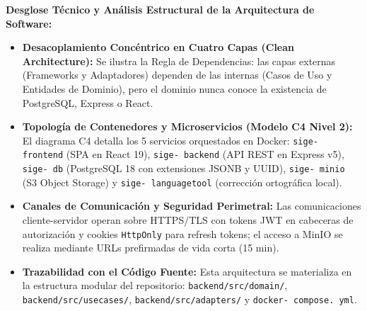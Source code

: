 \documentclass[12pt,a4paper]{article}
\begin{document}
\noindent
\noindent
\textbf{Desglose Técnico y Análisis Estructural de la Arquitectura de Software:}
\begin{itemize}[leftmargin=1.5em, itemsep=3pt]
    \item \textbf{Desacoplamiento Concéntrico en Cuatro Capas (Clean Architecture):} Se ilustra la Regla de Dependencias: las capas externas (Frameworks y Adaptadores) dependen de las internas (Casos de Uso y Entidades de Dominio), pero el dominio nunca conoce la existencia de PostgreSQL, Express o React.
    \item \textbf{Topología de Contenedores y Microservicios (Modelo C4 Nivel 2):} El diagrama C4 detalla los 5 servicios orquestados en Docker: \texttt{sige- frontend} (SPA en React 19), \texttt{sige- backend} (API REST en Express v5), \texttt{sige- db} (PostgreSQL 18 con extensiones JSONB y UUID), \texttt{sige- minio} (S3 Object Storage) y \texttt{sige- languagetool} (corrección ortográfica local).
    \item \textbf{Canales de Comunicación y Seguridad Perimetral:} Las comunicaciones cliente-servidor operan sobre HTTPS/TLS con tokens JWT en cabeceras de autorización y cookies \texttt{HttpOnly} para refresh tokens; el acceso a MinIO se realiza mediante URLs prefirmadas de vida corta (15 min).
    \item \textbf{Trazabilidad con el Código Fuente:} Esta arquitectura se materializa en la estructura modular del repositorio: \texttt{backend/\allowbreak  src/\allowbreak  domain/\allowbreak  }, \texttt{backend/\allowbreak  src/\allowbreak  usecases/\allowbreak  }, \texttt{backend/\allowbreak  src/\allowbreak  adapters/\allowbreak  } y \texttt{docker- compose. yml}.
\end{itemize}
\end{document}

